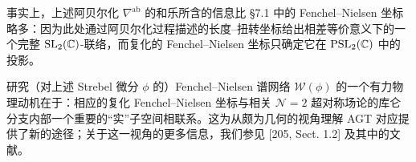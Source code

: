 
\begin{remark}[15.9]
事实上，上述阿贝尔化 $\nabla^{\mathrm{ab}}$ 的和乐所含的信息比 §7.1 中的 Fenchel–Nielsen 坐标略多：因为此处通过阿贝尔化过程描述的长度–扭转坐标给出相差等价意义下的一个完整 $\operatorname{SL}_2(\mathbb{C})$-联络，而复化的 Fenchel–Nielsen 坐标只确定它在 $\operatorname{PSL}_2(\mathbb{C})$ 中的投影。
\end{remark}

\begin{remark}[15.10]
研究（对上述 Strebel 微分 $\phi$ 的）Fenchel–Nielsen 谱网络 $\mathcal{W}(\phi)$ 的一个有力物理动机在于：相应的复化 Fenchel–Nielsen 坐标与相关 $\mathcal{N}=2$ 超对称场论的库仑分支内部一个重要的“实”子空间相联系。这为从颇为几何的视角理解 AGT 对应提供了新的途径；关于这一视角的更多信息，我们参见 [205, Sect. 1.2] 及其中的文献。
\end{remark}

